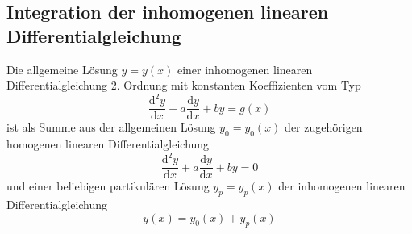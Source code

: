 \subsection{Integration der inhomogenen linearen Differentialgleichung}
Die allgemeine Lösung $y=y\left(x\right)$ einer inhomogenen linearen Differentialgleichung 2. Ordnung mit konstanten Koeffizienten vom Typ
\begin{equation}
\boxed{\dfrac{\text{d}^2y}{\text{d}x}+a\dfrac{\text{d}y}{\text{d}x}+by=g\left(x\right)}
\end{equation}
ist als Summe aus der allgemeinen Lösung $y_0=y_0\left(x\right)$ der zugehörigen homogenen linearen Differentialgleichung
\begin{equation}
\boxed{\dfrac{\text{d}^2y}{\text{d}x}+a\dfrac{\text{d}y}{\text{d}x}+by=0}
\end{equation}
und einer beliebigen partikulären Lösung $y_p=y_p\left(x\right)$ der inhomogenen linearen Differentialgleichung 
\begin{equation}
\boxed{y\left(x\right)=y_0\left(x\right)+y_p\left(x\right)}
\end{equation}
